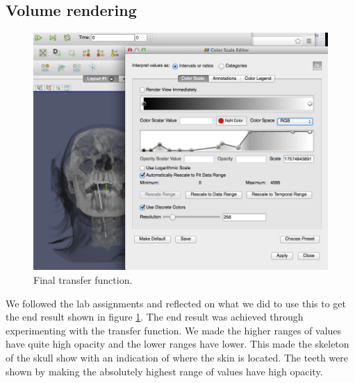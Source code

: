 \documentclass[a4paper]{article}
\begin{document}
\subsection{Volume rendering}
\begin{figure}
    \label{fig:volume}
    \includegraphics[width=1\linewidth]{lab5/head-transfer-function.png}
    \caption{Final transfer function.}
\end{figure}
We followed the lab assignments and reflected on what we did to use this to get
the end result shown in figure \ref{fig:volume}. The end result was achieved through
experimenting with the transfer function. We made the higher ranges of values
have quite high opacity and the lower ranges have lower. This made the skeleton
of the skull show with an indication of where the skin is located. The teeth
were shown by making the absolutely highest range of values have high opacity.
\end{document}
